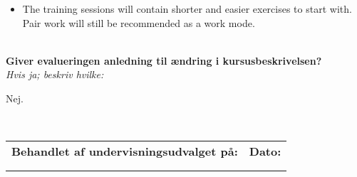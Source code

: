 \documentclass[11pt]{article}
\begin{document}
\begin{itemize}
 \item The training sessions will contain shorter and easier exercises
   to start with. Pair work will still be recommended as a work mode.
%  
%   


%   
%
   
%  

%
%
%
%

 \end{itemize}


~\\[1cm]\textcolor{sdublue}{{\bf Giver evalueringen anledning til ændring i kursusbeskrivelsen?}\\
{\small \em Hvis ja; beskriv hvilke:}}

Nej. 

~\\[1cm]
\begin{tabu} to 1.0
  \hline
  Behandlet af undervisningsudvalget på: & Dato:\\ & \\ & \\ \hline
\end{tabu}
\end{document}
